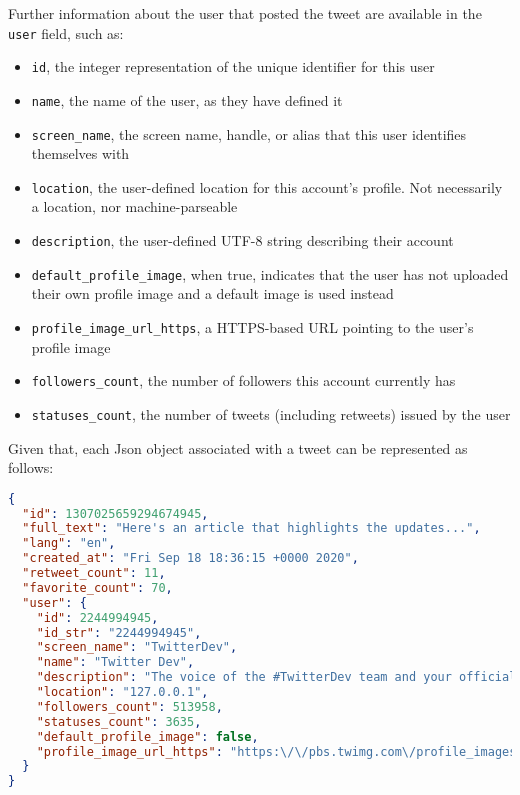 Further information about the user that posted the tweet are available in the \texttt{user} field, such as:

\begin{itemize}
	\item \texttt{id}, the integer representation of the unique identifier for this user
	\item \texttt{name}, the name of the user, as they have defined it
	\item \texttt{screen\_name}, the screen name, handle, or alias that this user identifies themselves with
	\item \texttt{location}, the user-defined location for this account's profile. Not necessarily a location, nor machine-parseable
	\item \texttt{description}, the user-defined UTF-8 string describing their account
	\item \texttt{default\_profile\_image}, when true, indicates that the user has not uploaded their own profile image and a default image is used instead
	\item \texttt{profile\_image\_url\_https}, a HTTPS-based URL pointing to the user's profile image
	\item \texttt{followers\_count}, the number of followers this account currently has
	\item \texttt{statuses\_count}, the number of tweets (including retweets) issued by the user
\end{itemize}

Given that, each Json object associated with a tweet can be represented as follows:

\begin{lstlisting}[language=Json, caption={Final Json object for a tweet}, captionpos=b, label={lst:tweet_Json}]
{
  "id": 1307025659294674945,
  "full_text": "Here's an article that highlights the updates...",
  "lang": "en",
  "created_at": "Fri Sep 18 18:36:15 +0000 2020",
  "retweet_count": 11,
  "favorite_count": 70,
  "user": {
    "id": 2244994945,
    "id_str": "2244994945",
    "screen_name": "TwitterDev",
    "name": "Twitter Dev",
    "description": "The voice of the #TwitterDev team and your official...",
    "location": "127.0.0.1",
    "followers_count": 513958,
    "statuses_count": 3635,
    "default_profile_image": false,
    "profile_image_url_https": "https:\/\/pbs.twimg.com\/profile_images\/1283786620521652229\/lEODkLTh_normal.jpg"
  }
}
\end{lstlisting}



